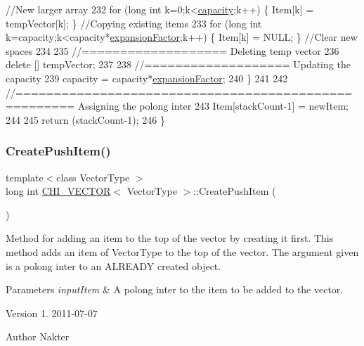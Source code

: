 \begin{DoxyCode}
{      //New larger array}
232         \textcolor{keywordflow}{for} (\textcolor{keywordtype}{long} \textcolor{keywordtype}{int} k=0;k<\hyperlink{class_c_h_i___v_e_c_t_o_r_ae73d9f91b472ae07bc32236605934ddb}{capacity};k++)                           \{ Item[k] = tempVector[k]; \}    \textcolor{comment}{
      //Copying existing items}
233         \textcolor{keywordflow}{for} (\textcolor{keywordtype}{long} \textcolor{keywordtype}{int} k=capacity;k<capacity*\hyperlink{class_c_h_i___v_e_c_t_o_r_a587c8d362d5149da97ec6519430c4747}{expansionFactor};k++)     \{ Item[k] = NULL; \}             \textcolor{comment}{
      //Clear new spaces}
234 
235         \textcolor{comment}{//=================== Deleting temp vector}
236         \textcolor{keyword}{delete} [] tempVector;
237 
238         \textcolor{comment}{//=================== Updating the capacity}
239         capacity = capacity*\hyperlink{class_c_h_i___v_e_c_t_o_r_a587c8d362d5149da97ec6519430c4747}{expansionFactor};
240     \}
241 
242     \textcolor{comment}{//===================================================== Assigning the polong inter}
243     Item[stackCount-1] = newItem;
244 
245     \textcolor{keywordflow}{return} (stackCount-1);
246 \}
\end{DoxyCode}
\mbox{\label{class_c_h_i___v_e_c_t_o_r_ada33203459caf93e3015d0c22c92a232_ada33203459caf93e3015d0c22c92a232}} 
\subsubsection{\texorpdfstring{Create\+Push\+Item()}{CreatePushItem()}}
{\footnotesize\ttfamily template$<$class Vector\+Type $>$ \\
long int \hyperlink{class_c_h_i___v_e_c_t_o_r}{C\+H\+I\+\_\+\+V\+E\+C\+T\+OR}$<$ Vector\+Type $>$\+::Create\+Push\+Item (\begin{DoxyParamCaption}{ }\end{DoxyParamCaption})}

Method for adding an item to the top of the vector by creating it first. This method adds an item of Vector\+Type to the top of the vector. The argument given is a polong inter to an A\+L\+R\+E\+A\+DY created object.


\begin{DoxyParams}{Parameters}
{\em input\+Item} & A polong inter to the item to be added to the vector.\\
\hline
\end{DoxyParams}
\begin{DoxyVersion}{Version}
1. 2011-\/07-\/07 
\end{DoxyVersion}
\begin{DoxyAuthor}{Author}
Nakter 
\end{DoxyAuthor}


